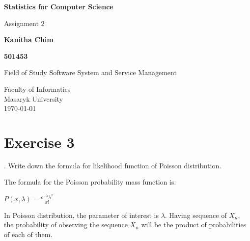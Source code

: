 \documentclass[12pt, oneside]{report}\usepackage[]{graphicx}\usepackage[]{color}
\begin{document}
\begin{titlepage}
    \begin{center}
        \vspace*{1cm}
        
        \Huge
          \textbf{Statistics for Computer Science} %
        
        \vspace{0.5cm}
        \LARGE
        Assignment 2 %
        
        \vspace{1.5cm}
        
        \textbf{Kanitha Chim} %
   		  \vspace{1.5cm}
        
        \textbf{501453} %
       
        \vfill
        
        Field of Study Software System and Service Management %
        
        \vspace{0.8cm}
          \Large
        Faculty of Informatics\\
        Masaryk University\\
        \vspace{0.5cm}
       \today
        
    \end{center}
\end{titlepage}


\section*{Exercise 3}
. Write down the formula for likelihood function of Poisson distribution.\newline

The formula for the Poisson probability mass function is: \newline

$P(x, \lambda) = \frac{e^{-\lambda} \lambda^{x}}{x!}$ \newline

In Poisson distribution, the parameter of interest is $\lambda$. Having sequence of $X_n$, the probability of observing the sequence $X_n$ will be the product of probabilities of each of them. \newline
\end{document}
